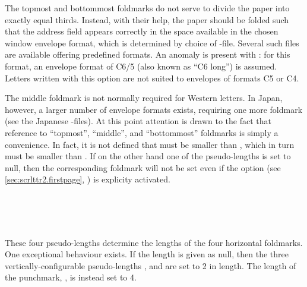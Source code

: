 The topmost and bottommost foldmarks do not serve to
divide the paper into exactly equal thirds. Instead, with their help, the
paper should be folded such that the address field appears correctly in the
space available in the chosen window envelope format, which is determined by
choice of -file. Several such files are available offering
predefined formats. An anomaly is present with : for this
format, an envelope format of C6/5 (also known as ``C6 long'') is
assumed. Letters written with this option are not suited to envelopes of
formats C5 or C4.

The middle foldmark is not normally required for Western letters. In Japan,
however, a larger number of envelope formats exists, requiring one more
foldmark (see the Japanese -files). At this point attention is drawn
to the fact that reference to ``topmost'', ``middle'', and ``bottommost''
foldmarks is simply a convenience. In fact, it is not defined that
 must be smaller than , which in
turn must be smaller than . If on the other hand one of
the pseudo-lengths is set to null, then the corresponding foldmark will not be
set even if the option
%
 (see \autoref{sec:scrlttr2.firstpage},
) is explicity activated.
%
%
%
%


\begin{Declaration}
  \\
  \\
  \\
\end{Declaration}
%
%
%
%
These four pseudo-lengths determine the
lengths of the four horizontal foldmarks. One
exceptional behaviour exists. If the length is given as null, then the three
vertically-configurable pseudo-lengths ,
 and  are set to 2
in length. The length of the punchmark, , is instead
set to 4.%
%
%
%
%


